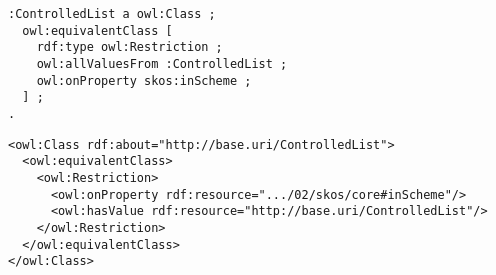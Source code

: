 \vspace{-\parskip}
\begin{minipage}[b]{.394\textwidth}
\begin{lstlisting}[language=Turtle, caption={In-scheme equivalent class in Turtle syntax}, captionpos=b]
:ControlledList a owl:Class ;  
  owl:equivalentClass [
    rdf:type owl:Restriction ;
    owl:allValuesFrom :ControlledList ;
    owl:onProperty skos:inScheme ;
  ] ;  
.
\end{lstlisting}
\end{minipage}%
\quad\vspace{-\parskip}
\begin{minipage}[b]{.62\textwidth}
\begin{lstlisting}[language=RDF/XML, caption={In-scheme equivalent class in RDF/XML syntax}, captionpos=b]
<owl:Class rdf:about="http://base.uri/ControlledList">  
  <owl:equivalentClass>
    <owl:Restriction>
      <owl:onProperty rdf:resource=".../02/skos/core#inScheme"/>
      <owl:hasValue rdf:resource="http://base.uri/ControlledList"/>
    </owl:Restriction>
  </owl:equivalentClass>
</owl:Class>
\end{lstlisting}
\end{minipage}
\vspace{-\parskip}